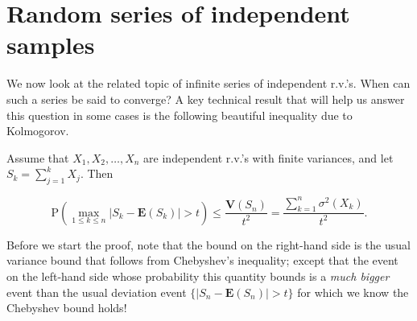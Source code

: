 \section{Random series of independent samples}

We now look at the related topic of infinite series
of independent r.v.'s. When can such a series be said
to converge? A key technical result that will help us
answer this question in some cases is the following
beautiful inequality due to Kolmogorov.

\begin{thm}
Assume that $X_1,X_2,\ldots,X_n$ are independent
r.v.'s with finite variances, and let
$S_k=\sum_{j=1}^k X_j$. Then

\[
\mathrm{P}\left( \max_{1\le k\le n} |S_k-\mathbf{E} (S_k)| > t \right) \le \frac{\mathbf{V}(S_n)}{t^2} = \frac{\sum_{k=1}^n \sigma^2(X_k)}{t^2}.
\]

\end{thm}

\noindent Before we start the proof, note that the bound on the
right-hand side is the usual variance bound that
follows from Chebyshev's inequality; except that the
event on the left-hand side whose probability this
quantity bounds is a \emph{much bigger} event than the
usual deviation event $\{|S_n-\mathbf{E}(S_n)|>t\}$
for which we know the Chebyshev bound holds!

